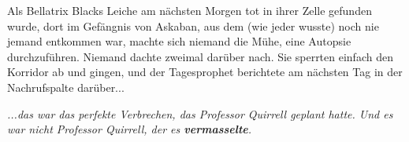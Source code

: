 Als Bellatrix Blacks Leiche am nächsten Morgen tot in ihrer Zelle gefunden
wurde, dort im Gefängnis von Askaban, aus dem (wie jeder wusste) noch nie jemand
entkommen war, machte sich niemand die Mühe, eine Autopsie durchzuführen.
Niemand dachte zweimal darüber nach. Sie sperrten einfach den Korridor ab und
gingen, und der Tagesprophet berichtete am nächsten Tag in der Nachrufspalte
darüber...

\emph{...das war das perfekte Verbrechen, das Professor Quirrell geplant hatte.
Und es war nicht Professor Quirrell, der es \textbf{vermasselte}.}

